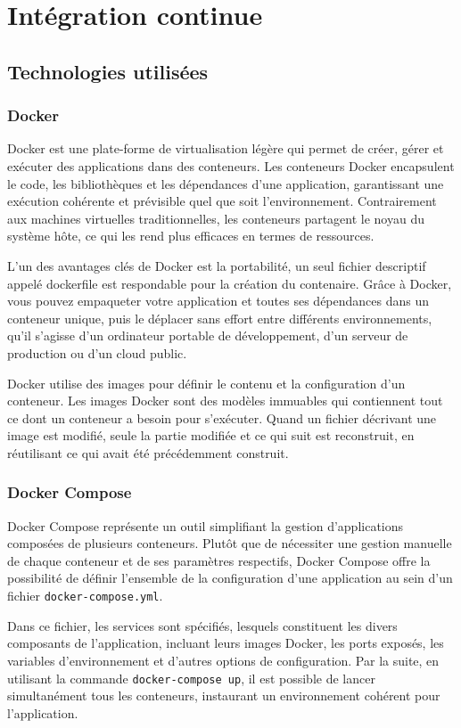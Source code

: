 \section{Intégration continue}
\subsection{Technologies utilisées}
\subsubsection{Docker}
Docker est une plate-forme de virtualisation légère qui permet de créer, gérer et exécuter des applications dans des conteneurs.
Les conteneurs Docker encapsulent le code, les bibliothèques et les dépendances d'une application, garantissant une exécution cohérente et prévisible quel que soit l'environnement.
Contrairement aux machines virtuelles traditionnelles, les conteneurs partagent le noyau du système hôte, ce qui les rend plus efficaces en termes de ressources.

L'un des avantages clés de Docker est la portabilité, un seul fichier descriptif appelé dockerfile est respondable pour la création du contenaire.
Grâce à Docker, vous pouvez empaqueter votre application et toutes ses dépendances dans un conteneur unique, puis le déplacer sans effort entre différents environnements, qu'il s'agisse d'un ordinateur portable de développement, d'un serveur de production ou d'un cloud public.

Docker utilise des images pour définir le contenu et la configuration d'un conteneur.
Les images Docker sont des modèles immuables qui contiennent tout ce dont un conteneur a besoin pour s'exécuter.
Quand un fichier décrivant une image est modifié, seule la partie modifiée et ce qui suit est reconstruit, en réutilisant ce qui avait été précédemment construit.

\subsubsection{Docker Compose}
Docker Compose représente un outil simplifiant la gestion d'applications composées de plusieurs conteneurs.
Plutôt que de nécessiter une gestion manuelle de chaque conteneur et de ses paramètres respectifs, Docker Compose offre la possibilité de définir l'ensemble de la configuration d'une application au sein d'un fichier \texttt{docker-compose.yml}.

Dans ce fichier, les services sont spécifiés, lesquels constituent les divers composants de l'application, incluant leurs images Docker, les ports exposés, les variables d'environnement et d'autres options de configuration.
Par la suite, en utilisant la commande \texttt{docker-compose up}, il est possible de lancer simultanément tous les conteneurs, instaurant un environnement cohérent pour l'application.


